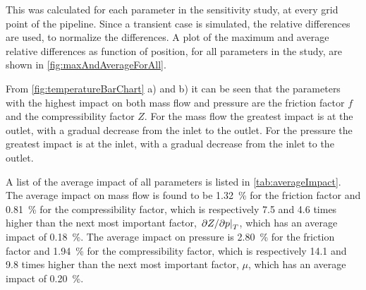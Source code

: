 This was calculated for each parameter in the sensitivity study, at every grid point of the pipeline. Since a transient case is simulated, the relative differences are used, to normalize the differences. %
%
%
A plot of the maximum and average relative differences as function of position, for all parameters in the study, are shown in \cref{fig:maxAndAverageForAll}. 

From \cref{fig:temperatureBarChart} a) and b) it can be seen that the parameters with the highest impact on both mass flow and pressure are the friction factor $f$ and the compressibility factor $Z$. For the mass flow the greatest impact is at the outlet, with a gradual decrease from the inlet to the outlet. For the pressure the greatest impact is at the inlet, with a gradual decrease from the inlet to the outlet. 

A list of the average impact of all parameters is listed in \cref{tab:averageImpact}. %
%
The average impact on mass flow is found to be \SI{1.32}{\percent} for the friction factor and \SI{0.81}{\percent} for the compressibility factor, %
which is respectively 7.5 and 4.6 times higher than the next most important factor, $\eval{\partial Z/\partial p}_T$, which has an average impact of \SI{0.18}{\percent}. %
%
The average impact on pressure is \SI{2.80}{\percent} for the friction factor and \SI{1.94}{\percent} for the compressibility factor, %
which is respectively 14.1 and 9.8 times higher than the next most important factor, $\mu$, which has an average impact of \SI{0.20}{\percent}. %
%

